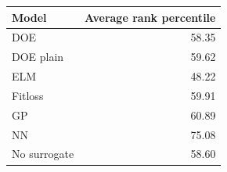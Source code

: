 \begin{tabular}{lr}
\toprule
Model & Average rank percentile \\
\midrule
DOE & 58.35 \\
DOE plain & 59.62 \\
ELM & 48.22 \\
Fitloss & 59.91 \\
GP & 60.89 \\
NN & 75.08 \\
No surrogate & 58.60 \\
\bottomrule
\end{tabular}
